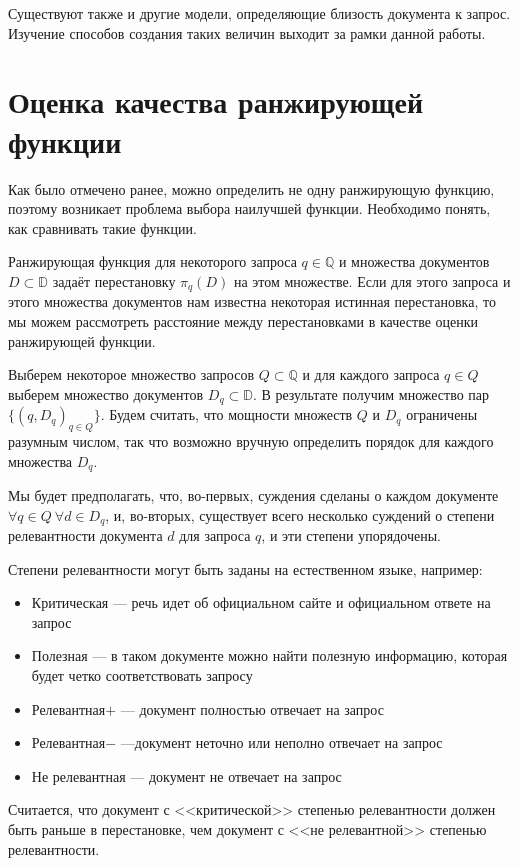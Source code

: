 \documentclass[specialist,
               substylefile = spbu.rtx,
               subf,href,colorlinks=true, 12pt]{disser}
\begin{document}
 Существуют также и другие модели, определяющие близость документа к запрос. Изучение способов создания таких величин выходит за рамки данной работы.\par

\section{Оценка качества ранжирующей функции}

Как было отмечено ранее, можно определить не одну ранжирующую функцию, поэтому возникает проблема выбора наилучшей функции. Необходимо понять, как сравнивать такие функции.\par

Ранжирующая функция для некоторого запроса $q \in \mathbb Q$  и множества документов $D \subset \mathbb D$  задаёт перестановку $\pi_q(D)$ на этом множестве. Если для этого запроса и этого множества документов нам известна некоторая истинная перестановка, то мы можем рассмотреть расстояние между перестановками в качестве оценки ранжирующей функции.\par

Выберем некоторое множество запросов $Q \subset \mathbb Q$ и для каждого запроса $q \in Q$ выберем множество документов $D_q \subset \mathbb D$. В результате получим множество пар $\{(q, D_q)_{q \in Q}\}$. Будем считать, что мощности множеств $Q$ и $D_q$ ограничены разумным числом, так что возможно вручную определить порядок для каждого множества $D_q$.\par

Мы будет предполагать, что, во-первых, суждения сделаны о каждом документе $\forall q \in Q\ \forall d \in D_q$, и, во-вторых, существует всего несколько суждений о степени релевантности документа $d$ для запроса $q$, и эти степени упорядочены.\par

Степени релевантности могут быть заданы на естественном языке, например:
\begin{itemize}
\item Критическая --- речь идет об официальном сайте и официальном ответе на запрос
\item Полезная --- в таком документе можно найти полезную информацию, которая будет четко соответствовать запросу
\item Релевантная$+$ --- документ полностью отвечает на запрос
\item Релевантная$-$ ---документ неточно или неполно отвечает на запрос
\item Не релевантная --- документ не отвечает на запрос
\end{itemize}
Считается, что документ с <<критической>> степенью релевантности должен быть раньше в перестановке, чем документ с <<не релевантной>> степенью релевантности.\par
\end{document}
